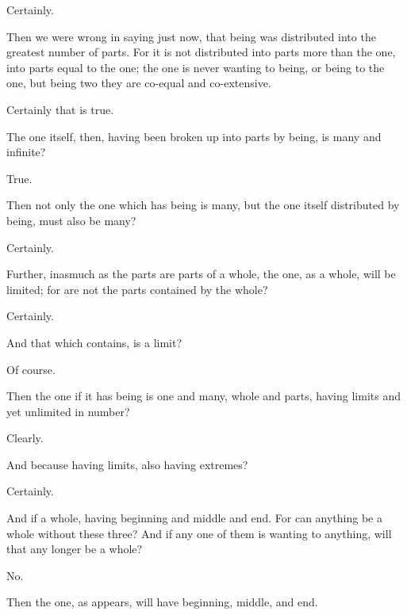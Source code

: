 \documentclass[11pt,letter]{article}
\begin{document}
\par  Certainly.

\par  Then we were wrong in saying just now, that being was distributed into the greatest number of parts. For it is not distributed into parts more than the one, into parts equal to the one; the one is never wanting to being, or being to the one, but being two they are co-equal and co-extensive.

\par  Certainly that is true.

\par  The one itself, then, having been broken up into parts by being, is many and infinite?

\par  True.

\par  Then not only the one which has being is many, but the one itself distributed by being, must also be many?

\par  Certainly.

\par  Further, inasmuch as the parts are parts of a whole, the one, as a whole, will be limited; for are not the parts contained by the whole?

\par  Certainly.

\par  And that which contains, is a limit?

\par  Of course.

\par  Then the one if it has being is one and many, whole and parts, having limits and yet unlimited in number?

\par  Clearly.

\par  And because having limits, also having extremes?

\par  Certainly.

\par  And if a whole, having beginning and middle and end. For can anything be a whole without these three? And if any one of them is wanting to anything, will that any longer be a whole?

\par  No.

\par  Then the one, as appears, will have beginning, middle, and end.
\end{document}
